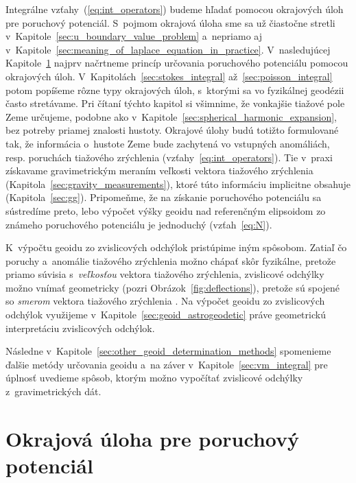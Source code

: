 \documentclass[a4paper, 12pt]{book}
\begin{document}
Integrálne vzťahy~(\ref{eq:int_operators}) budeme hľadať pomocou okrajových 
úloh pre poruchový potenciál.  S~pojmom okrajová úloha sme sa už čiastočne 
stretli v~Kapitole~\ref{sec:u_boundary_value_problem} a~nepriamo aj 
v~Kapitole~\ref{sec:meaning_of_laplace_equation_in_practice}.  V~nasledujúcej 
Kapitole~\ref{sec:boundary_value_problem} najprv načrtneme princíp určovania 
poruchového potenciálu pomocou okrajových úloh.  
V~Kapitolách~\ref{sec:stokes_integral} až~\ref{sec:poisson_integral} potom 
popíšeme rôzne typy okrajových úloh, s~ktorými sa vo fyzikálnej geodézii často 
stretávame.  Pri čítaní týchto kapitol si všimnime, že vonkajšie tiažové pole 
Zeme určujeme, podobne ako v~Kapitole~\ref{sec:spherical_harmonic_expansion}, 
bez potreby priamej znalosti hustoty.  Okrajové úlohy budú totižto formulované 
tak, že informácia o~hustote Zeme bude zachytená vo vstupných anomáliách, 
resp. poruchách tiažového zrýchlenia (vzťahy~\ref{eq:int_operators}).  Tie 
v~praxi získavame gravimetrickým meraním veľkosti vektora tiažového zrýchlenia 
(Kapitola~\ref{sec:gravity_measurements}), ktoré túto informáciu implicitne 
obsahuje (Kapitola~\ref{sec:gg}).  Pripomeňme, že na získanie poruchového 
potenciálu sa sústredíme preto, lebo výpočet výšky geoidu nad referenčným 
elipsoidom zo známeho poruchového potenciálu je jednoduchý (vzťah~\ref{eq:N}).

K~výpočtu geoidu zo zvislicových odchýlok pristúpime iným spôsobom.  Zatiaľ čo 
poruchy a~anomálie tiažového zrýchlenia možno chápať skôr fyzikálne, pretože 
priamo súvisia s~\emph{veľkosťou} vektora tiažového zrýchlenia, zvislicové 
odchýlky možno vnímať geometricky (pozri Obrázok~\ref{fig:deflections}), 
pretože sú spojené so \emph{smerom} vektora tiažového zrýchlenia 
\parencite{MoritzPhysicalGeodesy}.  Na výpočet geoidu zo zvislicových odchýlok 
využijeme v~Kapitole~\ref{sec:geoid_astrogeodetic} práve geometrickú 
interpretáciu zvislicových odchýlok.

Následne v~Kapitole~\ref{sec:other_geoid_determination_methods} spomenieme 
ďalšie metódy určovania geoidu a~na záver v~Kapitole~\ref{sec:vm_integral} pre 
úplnosť uvedieme spôsob, ktorým možno vypočítať zvislicové odchýlky 
z~gravimetrických dát.


\section{Okrajová úloha pre poruchový potenciál}
\label{sec:boundary_value_problem}
\end{document}
